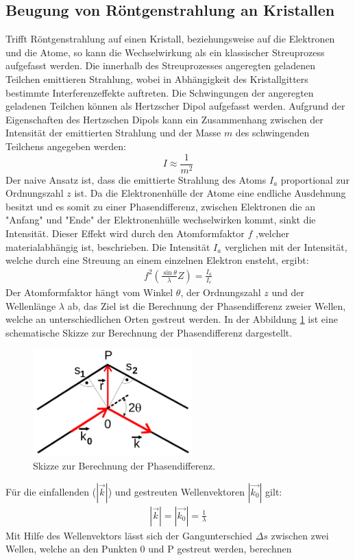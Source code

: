 \subsection{Beugung von Röntgenstrahlung an Kristallen}
Trifft Röntgenstrahlung auf einen Kristall, beziehungsweise auf die Elektronen
und die Atome, so kann die Wechselwirkung  als ein klassischer Streuprozess
aufgefasst werden. Die innerhalb des Streuprozesses angeregten geladenen
Teilchen emittieren Strahlung, wobei in Abhängigkeit des Kristallgitters
bestimmte Interferenzeffekte auftreten. Die Schwingungen der angeregten
geladenen Teilchen können als Hertzscher Dipol aufgefasst werden.
Aufgrund der Eigenschaften des Hertzschen Dipols kann ein
Zusammenhang zwischen der Intensität der emittierten Strahlung und
der Masse $m$ des schwingenden Teilchens angegeben werden:
$$I \approx \frac{1}{m^2}$$
Der naive Ansatz ist, dass die emittierte Strahlung des
Atoms $I_a$ proportional zur Ordnungszahl $z$ ist.
Da die Elektronenhülle der Atome eine endliche Ausdehnung besitzt und
es somit zu einer Phasendifferenz, zwischen Elektronen die an
"Anfang" und "Ende" der Elektronenhülle wechselwirken kommt,  sinkt die
Intensität. Dieser Effekt wird durch den Atomformfaktor $f$ ,welcher
materialabhängig ist, beschrieben. Die Intensität $I_a$ verglichen mit
der Intensität, welche durch eine Streuung an einem einzelnen Elektron ensteht,
ergibt:
\begin{align}
    f^2\left( \frac{\sin \theta}{\lambda}Z \right)=\frac{I_a}{I_e}
    \label{atom}
\end{align}
Der Atomformfaktor hängt vom Winkel $\theta$, der Ordnungszahl $z$ und der
Wellenlänge $\lambda$ ab, das Ziel ist die Berechnung der Phasendifferenz zweier
Wellen, welche an unterschiedlichen Orten gestreut werden.
In der Abbildung \ref{bragg} ist eine schematische Skizze zur
Berechnung der Phasendifferenz dargestellt.
\begin{figure}
    \centering
    \includegraphics[width=0.55\textwidth]{ressources/bragg.png}
    \caption{Skizze zur Berechnung der Phasendifferenz\cite{skript}.}
    \label{bragg}
\end{figure}
Für die einfallenden ($|\vec{k}|$) und gestreuten Wellenvektoren $|\vec{k_0}|$ gilt:
\begin{align}
|\vec{k}|=|\vec{k_0}|=\frac{1}{\lambda}
    \label{welle}
\end{align}
Mit Hilfe des Wellenvektors lässt sich der Gangunterschied $\Delta s$ zwischen
zwei Wellen, welche an den Punkten 0 und P gestreut werden, berechnen

